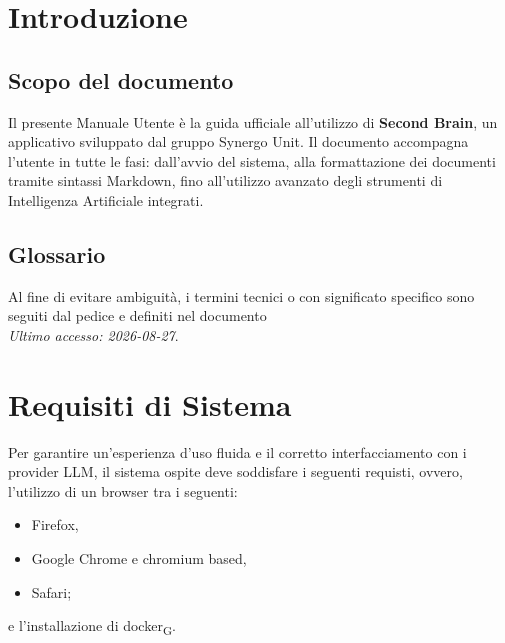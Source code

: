 \section{Introduzione}

\subsection{Scopo del documento}
Il presente Manuale Utente è la guida ufficiale all'utilizzo di \textbf{Second Brain}, 
un applicativo sviluppato dal gruppo Synergo Unit. Il documento accompagna l'utente in tutte le fasi: 
dall'avvio del sistema, alla formattazione dei documenti tramite sintassi Markdown, fino all'utilizzo 
avanzato degli strumenti di Intelligenza Artificiale integrati.

\subsection{Glossario}
Al fine di evitare ambiguità, i termini tecnici o con significato specifico sono seguiti dal pedice e definiti nel documento 
 \\
\textit{Ultimo accesso: 2026-08-27}.

\section{Requisiti di Sistema}
Per garantire un'esperienza d'uso fluida e il corretto interfacciamento con i provider LLM, il sistema 
ospite deve soddisfare i seguenti requisti, ovvero, l'utilizzo di un browser tra i seguenti:
\begin{itemize}
    \item Firefox,
    \item Google Chrome e chromium based,
    \item Safari;
\end{itemize}
e l'installazione di docker\textsubscript{G}.